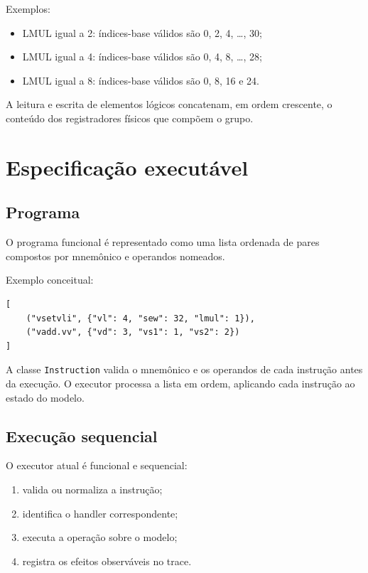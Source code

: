 Exemplos:

\begin{itemize}
    \item LMUL igual a 2: índices-base válidos são 0, 2, 4, \ldots, 30;
    \item LMUL igual a 4: índices-base válidos são 0, 4, 8, \ldots, 28;
    \item LMUL igual a 8: índices-base válidos são 0, 8, 16 e 24.
\end{itemize}

A leitura e escrita de elementos lógicos concatenam, em ordem crescente,
o conteúdo dos registradores físicos que compõem o grupo.

\section{Especificação executável}

\subsection{Programa}

O programa funcional é representado como uma lista ordenada de pares
compostos por mnemônico e operandos nomeados.

Exemplo conceitual:

\begin{verbatim}
[
    ("vsetvli", {"vl": 4, "sew": 32, "lmul": 1}),
    ("vadd.vv", {"vd": 3, "vs1": 1, "vs2": 2})
]
\end{verbatim}

A classe \texttt{Instruction} valida o mnemônico e os operandos de cada
instrução antes da execução. O executor processa a lista em ordem,
aplicando cada instrução ao estado do modelo.

\subsection{Execução sequencial}

O executor atual é funcional e sequencial:

\begin{enumerate}
    \item valida ou normaliza a instrução;
    \item identifica o handler correspondente;
    \item executa a operação sobre o modelo;
    \item registra os efeitos observáveis no trace.
\end{enumerate}

